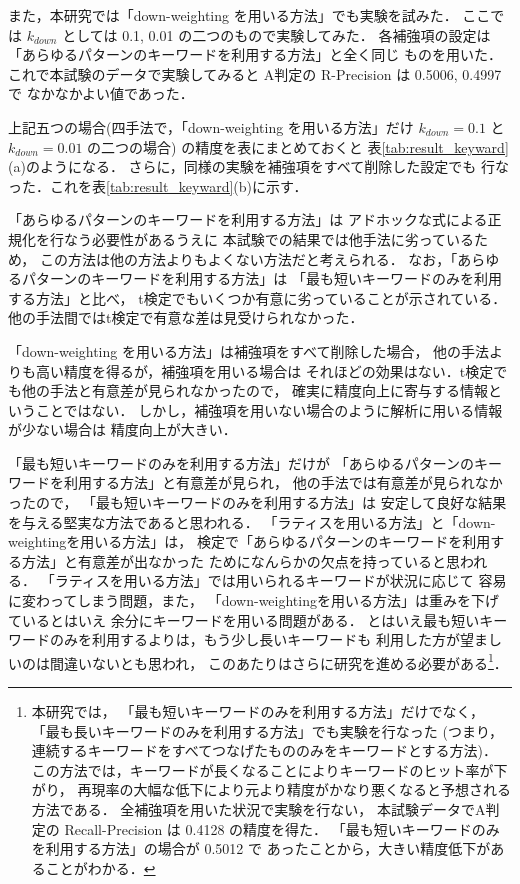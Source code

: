 また，本研究では「down-weighting を用いる方法」でも実験を試みた．
ここでは $k_{down}$ としては 0.1, 0.01 の二つのもので実験してみた．
各補強項の設定は
「あらゆるパターンのキーワードを利用する方法」と全く同じ
ものを用いた．
これで本試験のデータで実験してみると
A判定の R-Precision は 0.5006, 0.4997 で
なかなかよい値であった．

上記五つの場合(四手法で，「down-weighting を用いる方法」だけ
$k_{down} = 0.1$ と $k_{down} = 0.01$ の二つの場合)
の精度を表にまとめておくと
表\ref{tab:result_keyward}(a)のようになる．
さらに，同様の実験を補強項をすべて削除した設定でも
行なった．これを表\ref{tab:result_keyward}(b)に示す．

「あらゆるパターンのキーワードを利用する方法」は
アドホックな式による正規化を行なう必要性があるうえに
本試験での結果では他手法に劣っているため，
この方法は他の方法よりもよくない方法だと考えられる．
なお，「あらゆるパターンのキーワードを利用する方法」は
「最も短いキーワードのみを利用する方法」と比べ，
t検定でもいくつか有意に劣っていることが示されている．
他の手法間ではt検定で有意な差は見受けられなかった．

「down-weighting を用いる方法」は補強項をすべて削除した場合，
他の手法よりも高い精度を得るが，補強項を用いる場合は
それほどの効果はない．t検定でも他の手法と有意差が見られなかったので，
確実に精度向上に寄与する情報ということではない．
しかし，補強項を用いない場合のように解析に用いる情報が少ない場合は
精度向上が大きい．

「最も短いキーワードのみを利用する方法」だけが
「あらゆるパターンのキーワードを利用する方法」と有意差が見られ，
他の手法では有意差が見られなかったので，
「最も短いキーワードのみを利用する方法」は
安定して良好な結果を与える堅実な方法であると思われる．
「ラティスを用いる方法」と「down-weightingを用いる方法」は，
検定で「あらゆるパターンのキーワードを利用する方法」と有意差が出なかった
ためになんらかの欠点を持っていると思われる．
「ラティスを用いる方法」では用いられるキーワードが状況に応じて
容易に変わってしまう問題，また，
「down-weightingを用いる方法」は重みを下げているとはいえ
余分にキーワードを用いる問題がある．
とはいえ最も短いキーワードのみを利用するよりは，もう少し長いキーワードも
利用した方が望ましいのは間違いないとも思われ，
このあたりはさらに研究を進める必要がある\footnote{本研究では，
「最も短いキーワードのみを利用する方法」だけでなく，
「最も長いキーワードのみを利用する方法」でも実験を行なった
(つまり，連続するキーワードをすべてつなげたもののみをキーワードとする方法)．
この方法では，キーワードが長くなることによりキーワードのヒット率が下がり，
再現率の大幅な低下により元より精度がかなり悪くなると予想される方法である．
全補強項を用いた状況で実験を行ない，
本試験データでA判定の Recall-Precision は 0.4128 の精度を得た．
「最も短いキーワードのみを利用する方法」の場合が 0.5012 で
あったことから，大きい精度低下があることがわかる．}．


